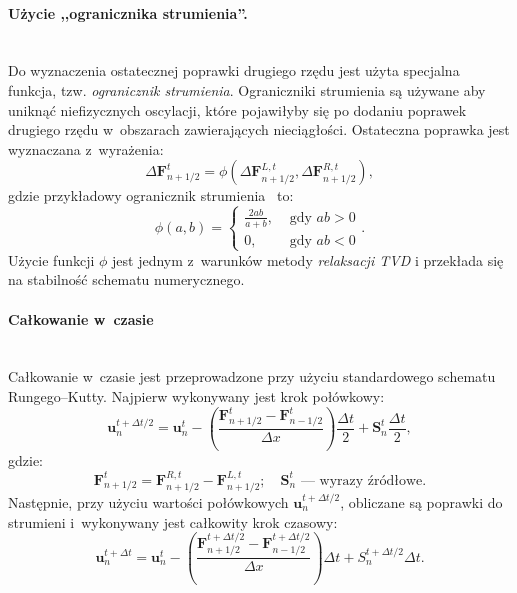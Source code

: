 \paragraph{Użycie ,,ogranicznika strumienia''.}~\\
Do wyznaczenia ostatecznej poprawki drugiego rzędu jest użyta specjalna funkcja,
tzw. \emph{ogranicznik strumienia}. Ograniczniki strumienia są używane aby
uniknąć niefizycznych oscylacji, które pojawiłyby się po dodaniu poprawek
drugiego rzędu w~obszarach zawierających nieciągłości.  Ostateczna poprawka jest
wyznaczana z~wyrażenia:
%
\begin{equation}
   \Delta \mathbf{F}^{t}_{n+1/2} = \phi\left(\Delta
   \mathbf{F}^{L,t}_{n+1/2},\Delta \mathbf{F}^{R,t}_{n+1/2} \right),
\end{equation}
%
gdzie przykładowy ogranicznik strumienia~\cite{leer} to:
%
\begin{equation}
   \phi(a,b) = 
   \begin{cases}
      \frac{2ab}{a+b}, & \textrm{ gdy }ab>0 \\
      0, & \textrm{ gdy }ab<0
   \end{cases}.
\end{equation}
%
Użycie funkcji $\phi$ jest jednym z~warunków metody \emph{relaksacji TVD} i
przekłada się na stabilność schematu numerycznego.

\paragraph{Całkowanie w~czasie}~\\
Całkowanie w~czasie jest przeprowadzone przy użyciu standardowego schematu
Rungego--Kutty. Najpierw wykonywany jest krok połówkowy:
%
\begin{equation}
   \mathbf{u}^{t+\Delta t/2}_{n} = \mathbf{u}^{t}_{n} -
   \left(\frac{\mathbf{F}^t_{n+1/2} - \mathbf{F}^t_{n-1/2}}{\Delta x}
   \right)\frac{\Delta t}{2} + \mathbf{S}_n^t \frac{\Delta t}{2},
\end{equation}
%
gdzie:
%
\begin{equation}
   \mathbf{F}^{t}_{n+1/2} = \mathbf{F}^{R,t}_{n+1/2} -
   \mathbf{F}^{L,t}_{n+1/2};\quad \mathbf{S}_n^t\textrm{ --- wyrazy źródłowe}.
\end{equation}
%
Następnie, przy użyciu wartości połówkowych $\mathbf{u}^{t+\Delta t/2}_{n}$,
obliczane są poprawki do strumieni i~wykonywany jest całkowity krok czasowy:
%
\begin{equation}
   \mathbf{u}^{t+\Delta t}_{n} = \mathbf{u}^{t}_{n} -
   \left(\frac{\mathbf{F}^{t+\Delta t/2}_{n+1/2} - \mathbf{F}^{t+\Delta
   t/2}_{n-1/2}}{\Delta x} \right)\Delta t + S_n^{t+\Delta t/2}\Delta t.
\end{equation}
%
%
